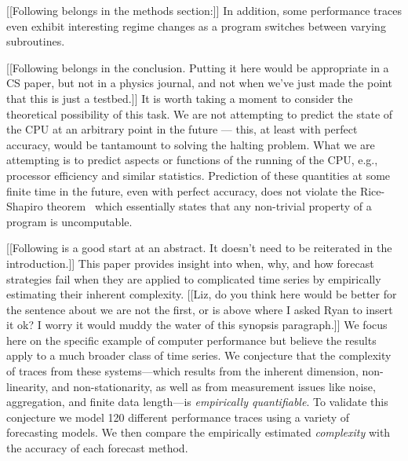 [[Following belongs in the methods section:]] In addition, some
performance traces even exhibit interesting regime changes as a
program switches between varying subroutines. 

[[Following belongs in the conclusion.  Putting it here would be
    appropriate in a CS paper, but not in a physics journal, and not
    when we've just made the point that this is just a testbed.]] 
It is worth taking a moment to consider the theoretical possibility of
this task. We are not attempting to predict the state of the CPU at an
arbitrary point in the future --- this, at least with perfect
accuracy, would be tantamount to solving the halting problem. What we
are attempting is to predict aspects or functions of the running of
the CPU, e.g., processor efficiency and similar statistics. Prediction
of these quantities at some finite time in the future, even with
perfect accuracy, does not violate the Rice-Shapiro
theorem~\cite{hopcroft} which essentially states that any non-trivial
property of a program is uncomputable.

[[Following is a good start at an abstract. It doesn't need to be
    reiterated in the introduction.]]  This paper provides insight
into when, why, and how forecast strategies fail when they are applied
to complicated time series by empirically estimating their inherent
complexity. [[Liz, do you think here would be better for the sentence
    about we are not the first, or is above where I asked Ryan to
    insert it ok? I worry it would muddy the water of this synopsis
    paragraph.]] We focus here on the specific example of computer
performance but believe the results apply to a much broader class of
time series. We conjecture that the complexity of traces from these
systems---which results from the inherent dimension, non-linearity,
and non-stationarity, as well as from measurement issues like noise,
aggregation, and finite data length---is \emph{empirically
  quantifiable}.  To validate this conjecture we model 120 different
performance traces using a variety of forecasting models.  We then
compare the empirically estimated \emph{complexity} with the accuracy
of each forecast method.
